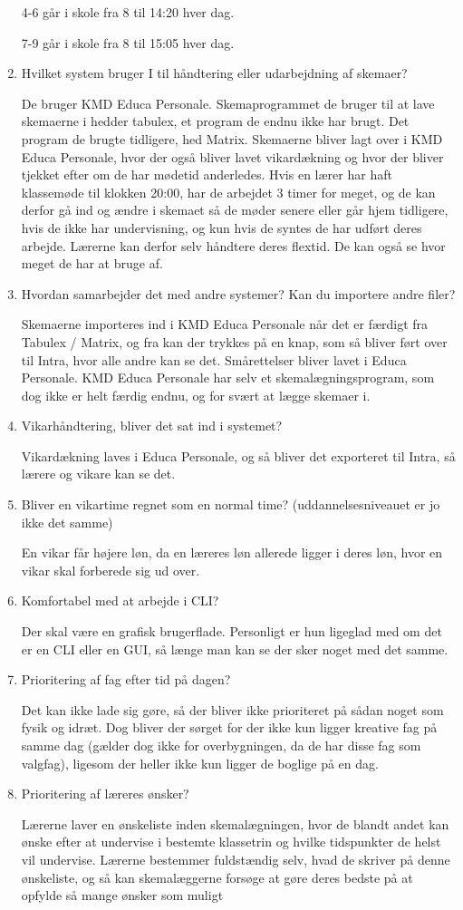 \begin{enumerate}
	4-6 går i skole fra 8 til 14:20 hver dag.
	
	7-9 går i skole fra 8 til 15:05 hver dag.
	\item Hvilket system bruger I til håndtering eller udarbejdning af skemaer?
	
	De bruger KMD Educa Personale. Skemaprogrammet de bruger til at lave skemaerne i hedder tabulex, et program de endnu ikke har brugt. Det program de brugte tidligere, hed Matrix.
	Skemaerne bliver lagt over i KMD Educa Personale, hvor der også bliver lavet vikardækning og hvor der bliver tjekket efter om de har mødetid anderledes. Hvis en lærer har haft klassemøde til klokken 20:00, har de arbejdet 3 timer for meget, og de kan derfor gå ind og ændre i skemaet så de møder senere eller går hjem tidligere, hvis de ikke har undervisning, og kun hvis de syntes de har udført deres arbejde. Lærerne kan derfor selv håndtere deres flextid. De kan også se hvor meget de har at bruge af.
	\item Hvordan samarbejder det med andre systemer? Kan du importere andre filer?
	
	Skemaerne importeres ind i KMD Educa Personale når det er færdigt fra Tabulex / Matrix, og fra kan der trykkes på en knap, som så bliver ført over til Intra, hvor alle andre kan se det. Smårettelser bliver lavet i Educa Personale.
	KMD Educa Personale har selv et skemalægningsprogram, som dog ikke er helt færdig endnu, og for svært at lægge skemaer i.
	\item Vikarhåndtering, bliver det sat ind i systemet?
	
	Vikardækning laves i Educa Personale, og så bliver det exporteret til Intra, så lærere og vikare kan se det.
	\item Bliver en vikartime regnet som en normal time? (uddannelsesniveauet er jo ikke det samme)
	
	En vikar får højere løn, da en læreres løn allerede ligger i deres løn, hvor en vikar skal forberede sig ud over.
	\item Komfortabel med at arbejde i CLI?
	
	Der skal være en grafisk brugerflade. Personligt er hun ligeglad med om det er en CLI eller en GUI, så længe man kan se der sker noget med det samme.
	\item Prioritering af fag efter tid på dagen?
	
	Det kan ikke lade sig gøre, så der bliver ikke prioriteret på sådan noget som fysik og idræt.
	Dog bliver der sørget for der ikke kun ligger kreative fag på samme dag (gælder dog ikke for overbygningen, da de har disse fag som valgfag), ligesom der heller ikke kun ligger de boglige på en dag.
	\item Prioritering af læreres ønsker?
	
	Lærerne laver en ønskeliste inden skemalægningen, hvor de blandt andet kan ønske efter at undervise i bestemte klassetrin og hvilke tidspunkter de helst vil undervise. Lærerne bestemmer fuldstændig selv, hvad de skriver på denne ønskeliste, og så kan skemalæggerne forsøge at gøre deres bedste på at opfylde så mange ønsker som muligt
\end{enumerate}